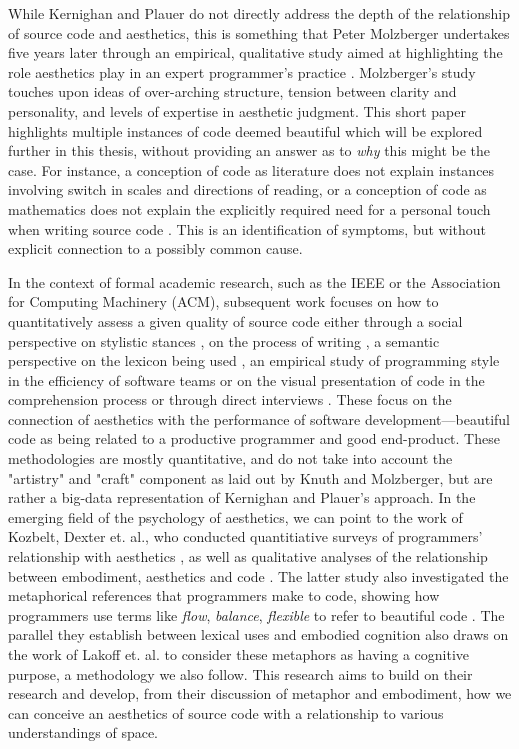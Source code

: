 While Kernighan and Plauer do not directly address the depth of the relationship of source code and aesthetics, this is something that Peter Molzberger undertakes five years later through an empirical, qualitative study aimed at highlighting the role aesthetics play in an expert programmer's practice \citep{molzberger_aesthetics_1983}. Molzberger's study touches upon ideas of over-arching structure, tension between clarity and personality, and levels of expertise in aesthetic judgment. This short paper highlights multiple instances of code deemed beautiful which will be explored further in this thesis, without providing an answer as to \emph{why} this might be the case. For instance, a conception of code as literature does not explain instances involving switch in scales and directions of reading, or a conception of code as mathematics does not explain the explicitly required need for a personal touch when writing source code \citep{molzberger_aesthetics_1983}. This is an identification of symptoms, but without explicit connection to a possibly common cause.

In the context of formal academic research, such as the IEEE or the Association for Computing Machinery (ACM), subsequent work focuses on how to quantitatively assess a given quality of source code either through a social perspective on stylistic stances \citep{oman_taxonomy_1990}, on the process of writing \citep{norick_effects_2010}, a semantic perspective on the lexicon being used \citep{fakhoury_improving_2019,guerrouj_normalizing_2013}, an empirical study of programming style in the efficiency of software teams \citep{reed_sometimes_2010,coleman_aesthetics_2018} or on the visual presentation of code in the comprehension process \citep{marcus_graphic_1982} or through direct interviews \citep{hermans_role_2020}.  These focus on the connection of aesthetics with the performance of software development—beautiful code as being related to a productive programmer and good end-product. These methodologies are mostly quantitative, and do not take into account the "artistry" and "craft" component as laid out by Knuth and Molzberger, but are rather a big-data representation of Kernighan and Plauer's approach. In the emerging field of the psychology of aesthetics, we can point to the work of Kozbelt, Dexter et. al., who conducted quantitiative surveys of programmers' relationship with aesthetics \citep{kozbelt_aesthetics_2012}, as well as qualitative analyses of the relationship between embodiment, aesthetics and code \citep{dexter_embodied_2011}. The latter study also investigated the metaphorical references that programmers make to code, showing how programmers use terms like \emph{flow}, \emph{balance}, \emph{flexible} to refer to beautiful code \citep{dexter_embodied_2011}. The parallel they establish between lexical uses and embodied cognition also draws on the work of Lakoff et. al. to consider these metaphors as having a cognitive purpose, a methodology we also follow. This research aims to build on their research and develop, from their discussion of metaphor and embodiment, how we can conceive an aesthetics of source code with a relationship to various understandings of space.


